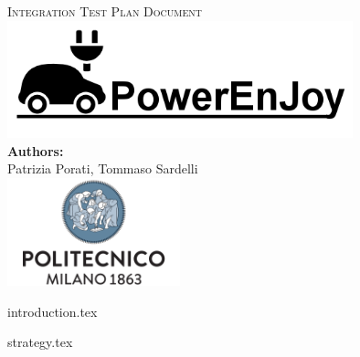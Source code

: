 \documentclass[a4paper,11pt]{article}
\begin{document}
\begin{titlepage}
\begin{center}
\textsc{\LARGE Integration Test Plan Document}\\[1.5cm] %

\includegraphics[width=10cm]{PowerEnJoy.png}\\
 
\vfill
\vfill
\textbf{Authors:}\\
Patrizia Porati, Tommaso Sardelli\\[2.0cm] 


\vfill
\vfill
\includegraphics[width=50mm]{polimi.png}\\
\end{center}
\end{titlepage}

\tableofcontents
\pagebreak


{introduction.tex}

{strategy.tex}





\end{document}
